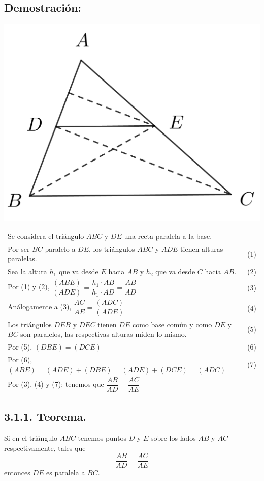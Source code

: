 \documentclass[12pt,a4paper]{article}
\begin{document}
\subsection*{Demostración:}
\begin{center}
\includegraphics[scale=0.6]{thales 1.png} 
\end{center}
\begin{tabular}{p{15.9cm}p{1cm}}
\\Se considera el triángulo $ABC$ y $DE$ una recta paralela a la base.
\\Por ser $BC$ paralelo a $DE$, los triángulos $ABC$ y $ADE$ tienen alturas paralelas. &(1)
\\Sea la altura $h_1$ que va desde $E$ hacia $AB$ y $h_2$ que va desde $C$ hacia $AB$. &(2)
\\Por (1) y (2), $\dfrac{(ABE)}{(ADE)}=\dfrac{h_1 \cdot AB }{h_1 \cdot AD}=\dfrac{AB}{AD}$ &(3)
\\Análogamente a (3), $\dfrac{AC}{AE}=\dfrac{(ADC)}{(ADE)}$ &(4)
\\Los triángulos $DEB$ y $DEC$ tienen  $DE$ como base común y como $DE$ y $BC$ son paralelos, las respectivas alturas miden lo mismo. &\medskip(5)
\\Por (5), $(DBE)= (DCE)$& (6)
\\Por (6), $(ABE)=(ADE)+(DBE)=(ADE)+ (DCE)= (ADC)$ & (7)
\\Por (3), (4) y (7); tenemos que $\dfrac{AB}{AD}=\dfrac{AC}{AE}$
\end{tabular}
\subsection*{3.1.1. Teorema.}
 Si en el triángulo $ABC$ tenemos puntos $D$ y $E$ sobre los lados $AB$ y $AC$ respectivamente, tales que $$\dfrac{AB}{AD}=\dfrac{AC}{AE}$$
entonces $DE$ es paralela a $BC$.
\end{document}
